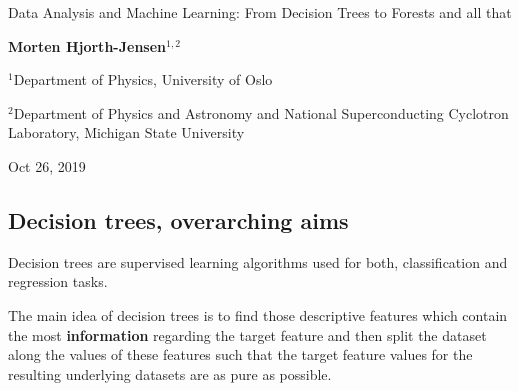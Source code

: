 \documentclass[%
oneside,                 %
final,                   %
10pt]{article}
\begin{document}

\newcommand{\exercisesection}[1]{\subsection*{#1}}






\thispagestyle{empty}

\begin{center}
{\LARGE\bf
\begin{spacing}{1.25}
Data Analysis and Machine Learning: From Decision Trees to Forests and all that
\end{spacing}
}
\end{center}


\begin{center}
{\bf Morten Hjorth-Jensen${}^{1, 2}$} \\ [0mm]
\end{center}

\begin{center}
\centerline{{\small ${}^1$Department of Physics, University of Oslo}}
\centerline{{\small ${}^2$Department of Physics and Astronomy and National Superconducting Cyclotron Laboratory, Michigan State University}}
\end{center}
    

\begin{center}
Oct 26, 2019
\end{center}

\vspace{1cm}


\subsection{Decision trees, overarching aims}


Decision trees are supervised learning algorithms used for both,
classification and regression tasks.


The main idea of decision trees
is to find those descriptive features which contain the most
\textbf{information} regarding the target feature and then split the dataset
along the values of these features such that the target feature values
for the resulting underlying datasets are as pure as possible.
\end{document}
